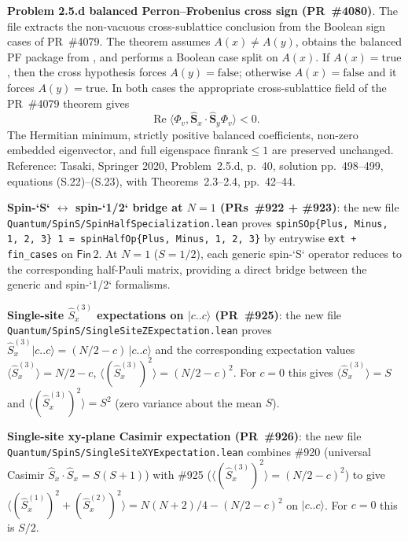 \documentclass[a4paper,11pt]{article}
\begin{document}
\textbf{Problem 2.5.d balanced Perron--Frobenius cross sign (PR~\#4080)}.
The file  extracts the
non-vacuous cross-sublattice conclusion from the Boolean sign cases of
PR~\#4079.  The theorem
 assumes
\(A(x)\ne A(y)\), obtains the balanced PF package from
, and
performs a Boolean case split on \(A(x)\).  If \(A(x)=\mathrm{true}\), then
the cross hypothesis forces \(A(y)=\mathrm{false}\); otherwise
\(A(x)=\mathrm{false}\) and it forces \(A(y)=\mathrm{true}\).  In both cases
the appropriate cross-sublattice field of the PR~\#4079 theorem gives
\[
  \operatorname{Re}\langle \Phi_v,
    \widehat{\mathbf S}_x\cdot\widehat{\mathbf S}_y\Phi_v\rangle < 0 .
\]
The Hermitian minimum, strictly positive balanced coefficients, non-zero
embedded eigenvector, and full eigenspace \(\mathrm{finrank}\le1\) are
preserved unchanged.  Reference: Tasaki, Springer 2020, Problem~2.5.d, p.~40,
solution pp.~498--499, equations (S.22)--(S.23), with Theorems~2.3--2.4,
pp.~42--44.

\textbf{Spin-`S` $\leftrightarrow$ spin-`1/2` bridge at $N = 1$
(PRs~\#922 + \#923)}: the new file
\texttt{Quantum/SpinS/SpinHalfSpecialization.lean} proves
\texttt{spinSOp\{Plus, Minus, 1, 2, 3\} 1 = spinHalfOp\{Plus, Minus, 1, 2, 3\}}
by entrywise \texttt{ext + fin\_cases} on $\textsf{Fin}\,2$. At
$N = 1$ ($S = 1/2$), each generic spin-`S` operator reduces to the
corresponding half-Pauli matrix, providing a direct bridge between
the generic and spin-`1/2` formalisms.

\textbf{Single-site $\hat{S}^{(3)}_x$ expectations on $|c..c\rangle$
(PR~\#925)}: the new file
\texttt{Quantum/SpinS/SingleSiteZExpectation.lean} proves
$\hat{S}^{(3)}_x|c..c\rangle = (N/2 - c)\,|c..c\rangle$ and the
corresponding expectation values $\langle\hat{S}^{(3)}_x\rangle = N/2 - c$,
$\langle(\hat{S}^{(3)}_x)^2\rangle = (N/2-c)^2$. For $c=0$ this gives
$\langle\hat{S}^{(3)}_x\rangle = S$ and $\langle(\hat{S}^{(3)}_x)^2\rangle = S^2$
(zero variance about the mean $S$).

\textbf{Single-site xy-plane Casimir expectation (PR~\#926)}: the
new file \texttt{Quantum/SpinS/SingleSiteXYExpectation.lean}
combines \#920 (universal Casimir $\hat{S}_x\cdot\hat{S}_x = S(S+1)$)
with \#925 ($\langle(\hat{S}^{(3)}_x)^2\rangle = (N/2-c)^2$) to give
$\langle(\hat{S}^{(1)}_x)^2 + (\hat{S}^{(2)}_x)^2\rangle =
N(N+2)/4 - (N/2-c)^2$ on $|c..c\rangle$. For $c=0$ this is $S/2$.
\end{document}
